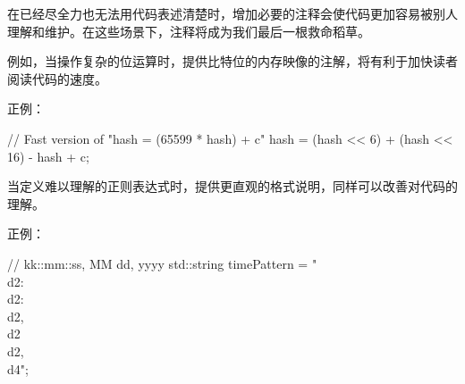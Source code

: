 \begin{content}
在已经尽全力也无法用代码表述清楚时，增加必要的注释会使代码更加容易被别人理解和维护。在这些场景下，注释将成为我们最后一根救命稻草。

\begin{enum}
\end{enum}

例如，当操作复杂的位运算时，提供比特位的内存映像的注解，将有利于加快读者阅读代码的速度。

正例：
\begin{leftbar}
\begin{c++}
// Fast version of "hash = (65599 * hash) + c"
hash = (hash << 6) + (hash << 16) - hash + c;
\end{c++}
\end{leftbar}

当定义难以理解的正则表达式时，提供更直观的格式说明，同样可以改善对代码的理解。

正例：
\begin{leftbar}
\begin{c++}
// kk::mm::ss, MM dd, yyyy
std::string timePattern = "\\d{2}:\\d{2}:\\d{2}, \\d{2} \\d{2}, \\d{4}";
\end{c++}
\end{leftbar}

\end{content}